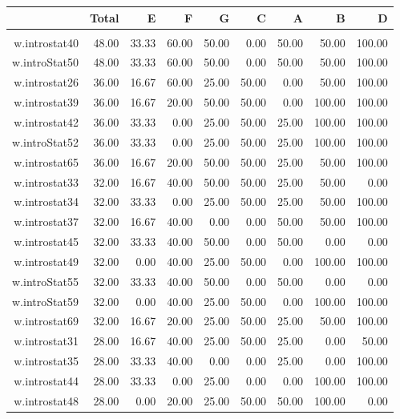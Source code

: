 \documentclass[12pt,english,nohyper]{tufte-handout}\usepackage[]{graphicx}\usepackage[]{color}
\begin{document}
\begin{longtable}{rrrrrrrrr}
  \hline
 & Total & E & F & G & C & A & B & D \\ 
  \hline
 &  &  &  &  &  &  &  &  \\ 
  w.introstat40 & 48.00 & 33.33 & 60.00 & 50.00 & 0.00 & 50.00 & 50.00 & 100.00 \\ 
  w.introStat50 & 48.00 & 33.33 & 60.00 & 50.00 & 0.00 & 50.00 & 50.00 & 100.00 \\ 
  w.introstat26 & 36.00 & 16.67 & 60.00 & 25.00 & 50.00 & 0.00 & 50.00 & 100.00 \\ 
  w.introstat39 & 36.00 & 16.67 & 20.00 & 50.00 & 50.00 & 0.00 & 100.00 & 100.00 \\ 
  w.introstat42 & 36.00 & 33.33 & 0.00 & 25.00 & 50.00 & 25.00 & 100.00 & 100.00 \\ 
  w.introStat52 & 36.00 & 33.33 & 0.00 & 25.00 & 50.00 & 25.00 & 100.00 & 100.00 \\ 
  w.introstat65 & 36.00 & 16.67 & 20.00 & 50.00 & 50.00 & 25.00 & 50.00 & 100.00 \\ 
  w.introstat33 & 32.00 & 16.67 & 40.00 & 50.00 & 50.00 & 25.00 & 50.00 & 0.00 \\ 
  w.introstat34 & 32.00 & 33.33 & 0.00 & 25.00 & 50.00 & 25.00 & 50.00 & 100.00 \\ 
  w.introstat37 & 32.00 & 16.67 & 40.00 & 0.00 & 0.00 & 50.00 & 50.00 & 100.00 \\ 
  w.introstat45 & 32.00 & 33.33 & 40.00 & 50.00 & 0.00 & 50.00 & 0.00 & 0.00 \\ 
  w.introstat49 & 32.00 & 0.00 & 40.00 & 25.00 & 50.00 & 0.00 & 100.00 & 100.00 \\ 
  w.introStat55 & 32.00 & 33.33 & 40.00 & 50.00 & 0.00 & 50.00 & 0.00 & 0.00 \\ 
  w.introStat59 & 32.00 & 0.00 & 40.00 & 25.00 & 50.00 & 0.00 & 100.00 & 100.00 \\ 
  w.introstat69 & 32.00 & 16.67 & 20.00 & 25.00 & 50.00 & 25.00 & 50.00 & 100.00 \\ 
  w.introstat31 & 28.00 & 16.67 & 40.00 & 25.00 & 50.00 & 25.00 & 0.00 & 50.00 \\ 
  w.introstat35 & 28.00 & 33.33 & 40.00 & 0.00 & 0.00 & 25.00 & 0.00 & 100.00 \\ 
  w.introstat44 & 28.00 & 33.33 & 0.00 & 25.00 & 0.00 & 0.00 & 100.00 & 100.00 \\ 
  w.introstat48 & 28.00 & 0.00 & 20.00 & 25.00 & 50.00 & 50.00 & 100.00 & 0.00 \\ 

\end{longtable}
\end{document}
